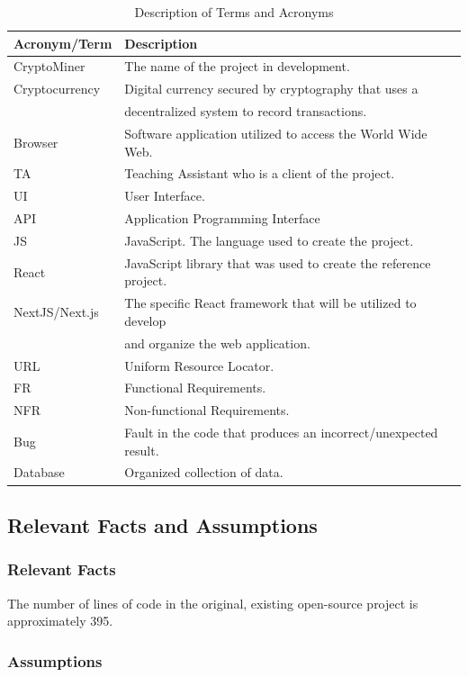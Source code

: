 \documentclass[12pt, titlepage]{article}
\begin{document}
\begin{table}[!h]
    \begin{tabular}{lll} \toprule
        \textbf{Acronym/Term} & \textbf{Description}\\ \midrule
        CryptoMiner & The name of the project in development. \\ 
        Cryptocurrency & Digital currency secured by cryptography that uses a \\ & decentralized system to record transactions. \\ 
        Browser & Software application utilized to access the World Wide Web. \\ 
        TA & Teaching Assistant who is a client of the project. \\ 
        UI & User Interface. \\
        API & Application Programming Interface \\
        JS & JavaScript. The language used to create the project. \\
        React & JavaScript library that was used to create the reference project. \\
        NextJS/Next.js & The specific React framework that will be utilized to develop \\ & and organize the web application. \\ 
        URL & Uniform Resource Locator. \\
        FR & Functional Requirements. \\
        NFR & Non-functional Requirements. \\
        Bug & Fault in the code that produces an incorrect/unexpected result. \\
        Database & Organized collection of data. \\
        \bottomrule
    \end{tabular}
    \caption{Description of Terms and Acronyms}
    \label{tab:my_label}
\end{table}

\subsection{Relevant Facts and Assumptions}
\subsubsection{Relevant Facts}
The number of lines of code in the original, existing open-source project is approximately 395.
\subsubsection{Assumptions}
\end{document}
